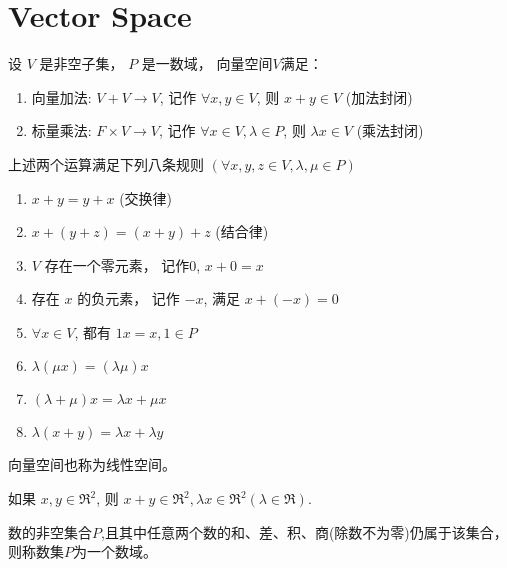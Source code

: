 \section{Vector Space}

\begin{definition}[向量空间$V$]
    设 $  V  $ 是非空子集， $  P  $ 是一数域， 向量空间$V$满足：

    \begin{enumerate}
        \item 向量加法: $  V+V \rightarrow V  $, 记作 $  \forall x, y \in V  $, 则 $  x+y \in V  $ (加法封闭)
        \item 标量乘法: $  F \times V \rightarrow V  $, 记作 $  \forall x \in V, \lambda \in P  $, 则 $  \lambda x \in V  $ (乘法封闭)
    \end{enumerate}


\end{definition}

\begin{theorem}
    上述两个运算满足下列八条规则 $  (\forall x, y, z \in V, \lambda, \mu \in P)  $ 
\begin{enumerate}
    \item $  x+y=y+x  $ (交换律) 
    \item $  x+(y+z)=(x+y)+z  $ (结合律)
    \item $  V  $ 存在一个零元素， 记作$0$, $  x+0=x  $
    \item 存在 $  x  $ 的负元素， 记作 $  -x  $, 满足 $  x+(-x)=0  $
    \item $  \forall x \in V  $, 都有 $  1 x=x, 1 \in P  $
    \item $  \lambda(\mu x)=(\lambda \mu) x  $
    \item $  (\lambda+\mu) x=\lambda x+\mu x  $
    \item $   \lambda(x+y)=\lambda x+\lambda y  $
\end{enumerate}
\end{theorem}

\begin{corollary}
    向量空间也称为线性空间。
\end{corollary}

\begin{corollary}
    如果 $  x, y \in \mathfrak{R}^{2}  $, 则 $  x+y \in \mathfrak{R}^{2}, \lambda x \in \mathfrak{R}^{2}(\lambda \in \mathfrak{R})  $.
\end{corollary}

\begin{definition}[数域]
    数的非空集合$P$,且其中任意两个数的和、差、积、商(除数不为零)仍属于该集合， 则称数集$P$为一个数域。 
\end{definition}

